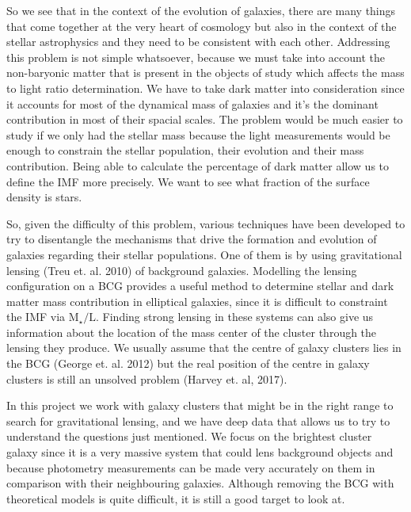 So we see that in the context of the evolution of galaxies, there are many things that come together at the very heart of cosmology but also in the context of the stellar astrophysics and they need to be consistent with each other. Addressing this problem is not simple whatsoever, because we must take into account the non-baryonic matter that is present in the objects of study which affects the mass to light ratio determination. We have to take dark matter into consideration since it accounts for most of the dynamical mass of galaxies and it's the dominant contribution in most of their spacial scales. The problem would be much easier to study if we only had the stellar mass because the light measurements would be enough to constrain the stellar population, their evolution and their mass contribution. Being able to calculate the percentage of dark matter allow us to define the IMF more precisely. We want to see what fraction of the surface density is stars.

So, given the difficulty of this problem, various techniques have been developed to try to disentangle the mechanisms that drive the formation and evolution of galaxies regarding their stellar populations. One of them is by using gravitational lensing (Treu et. al. 2010) of background galaxies. Modelling the lensing configuration on a BCG provides a useful method to determine stellar and dark matter mass contribution in elliptical galaxies, since it is difficult to constraint the IMF via $\textrm{M}_{\star}/\text{L}$. Finding strong lensing in these systems can also give us information about the location of the mass center of the cluster through the lensing they produce. We usually assume that the centre of galaxy clusters lies in the BCG (George et. al. 2012) but the real position of the centre in galaxy clusters is still an unsolved problem (Harvey et. al, 2017). 

In this project we work with galaxy clusters that might be in the right range to search for gravitational lensing, and we have deep data that allows us to try to understand the questions just mentioned. We focus on the brightest cluster galaxy since it is a very massive system that could lens background objects and because photometry measurements can be made very accurately on them in comparison with their neighbouring galaxies. Although removing the BCG with theoretical models is quite difficult, it is still a good target to look at. 
   
\newpage
